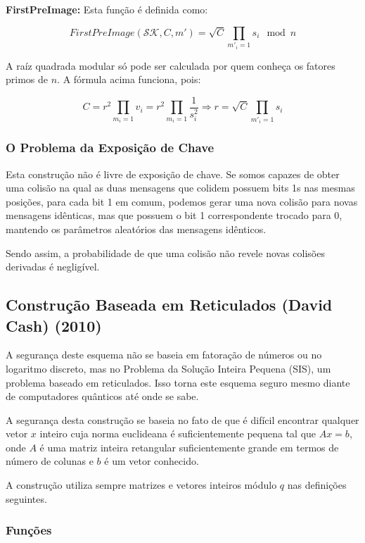 \documentclass[a4paper]{article}
\begin{document}
\textbf{FirstPreImage: } Esta função é definida como:

$$
FirstPreImage(\mathcal{SK}, C, m') = \sqrt{C}\prod_{m'_i=1}s_i \mod n
$$

A raíz quadrada modular só pode ser calculada por quem conheça os
fatores primos de $n$. A fórmula acima funciona, pois:

$$ C = r^2\prod_{m_i=1}v_i =
r^2\prod_{m_i=1}\frac{1}{s_i^2}\Longrightarrow r=\sqrt{C}\prod_{m'_i=1}s_i
$$

\subsubsection{O Problema da Exposição de Chave}

Esta construção não é livre de exposição de chave. Se somos capazes de
obter uma colisão na qual as duas mensagens que colidem possuem bits
1s nas mesmas posições, para cada bit 1 em comum, podemos gerar uma
nova colisão para novas mensagens idênticas, mas que possuem o bit 1
correspondente trocado para 0, mantendo os parâmetros aleatórios das
mensagens idênticos.

Sendo assim, a probabilidade de que uma colisão não revele novas
colisões derivadas é negligível.


\subsection{Construção Baseada em Reticulados (David Cash)
  (2010)\cite{reticulado}}

A segurança deste esquema não se baseia em fatoração de números ou no
logaritmo discreto, mas no Problema da Solução Inteira Pequena (SIS),
um problema baseado em reticulados. Isso torna este esquema seguro
mesmo diante de computadores quânticos até onde se sabe.

A segurança desta construção se baseia no fato de que é difícil
encontrar qualquer vetor $x$ inteiro cuja norma euclideana é
suficientemente pequena tal que $Ax = b$, onde $A$ é uma matriz
inteira retangular suficientemente grande em termos de número de
colunas e $b$ é um vetor conhecido.

A construção utiliza sempre matrizes e vetores inteiros módulo $q$ nas
definições seguintes.

\subsubsection{Funções}
\end{document}
